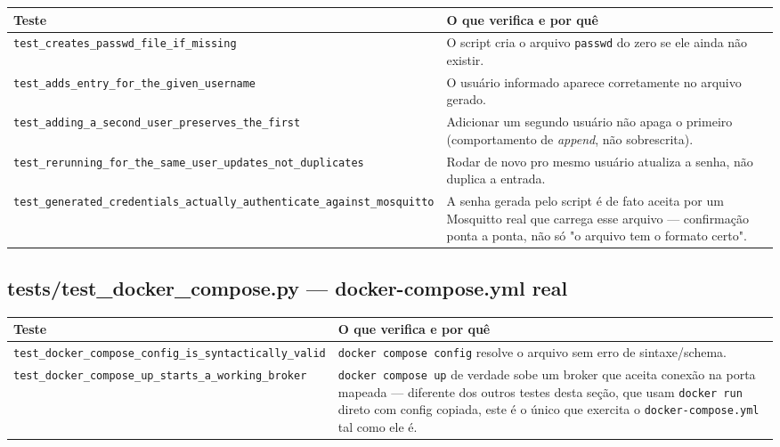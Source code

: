 \documentclass[10pt,a4paper]{article}
\begin{document}
\begin{center}
\begin{longtable}{L{5cm}L{9.5cm}}
\toprule
\textbf{Teste} & \textbf{O que verifica e por quê} \\
\midrule
\endhead
\texttt{test\_\allowbreak creates\_\allowbreak passwd\_\allowbreak file\_\allowbreak if\_\allowbreak missing} & O script cria o arquivo \texttt{passwd} do zero se ele ainda não existir. \\
\texttt{test\_\allowbreak adds\_\allowbreak entry\_\allowbreak for\_\allowbreak the\_\allowbreak given\_\allowbreak username} & O usuário informado aparece corretamente no arquivo gerado. \\
\texttt{test\_\allowbreak adding\_\allowbreak a\_\allowbreak second\_\allowbreak user\_\allowbreak preserves\_\allowbreak the\_\allowbreak first} & Adicionar um segundo usuário não apaga o primeiro (comportamento de \textit{append}, não sobrescrita). \\
\texttt{test\_\allowbreak rerunning\_\allowbreak for\_\allowbreak the\_\allowbreak same\_\allowbreak user\_\allowbreak updates\_\allowbreak not\_\allowbreak duplicates} & Rodar de novo pro mesmo usuário atualiza a senha, não duplica a entrada. \\
\texttt{test\_\allowbreak generated\_\allowbreak credentials\_\allowbreak actually\_\allowbreak authenticate\_\allowbreak against\_\allowbreak mosquitto} & A senha gerada pelo script é de fato aceita por um Mosquitto real que carrega esse arquivo — confirmação ponta a ponta, não só "o arquivo tem o formato certo". \\
\bottomrule
\end{longtable}
\end{center}

\subsection{tests/test\_\allowbreak docker\_\allowbreak compose.py --- docker-compose.yml real}

\begin{center}
\begin{longtable}{L{5cm}L{9.5cm}}
\toprule
\textbf{Teste} & \textbf{O que verifica e por quê} \\
\midrule
\endhead
\texttt{test\_\allowbreak docker\_\allowbreak compose\_\allowbreak config\_\allowbreak is\_\allowbreak syntactically\_\allowbreak valid} & \texttt{docker compose config} resolve o arquivo sem erro de sintaxe/schema. \\
\texttt{test\_\allowbreak docker\_\allowbreak compose\_\allowbreak up\_\allowbreak starts\_\allowbreak a\_\allowbreak working\_\allowbreak broker} & \texttt{docker compose up} de verdade sobe um broker que aceita conexão na porta mapeada — diferente dos outros testes desta seção, que usam \texttt{docker run} direto com config copiada, este é o único que exercita o \texttt{docker-compose.yml} tal como ele é. \\
\bottomrule
\end{longtable}
\end{center}
\end{document}
